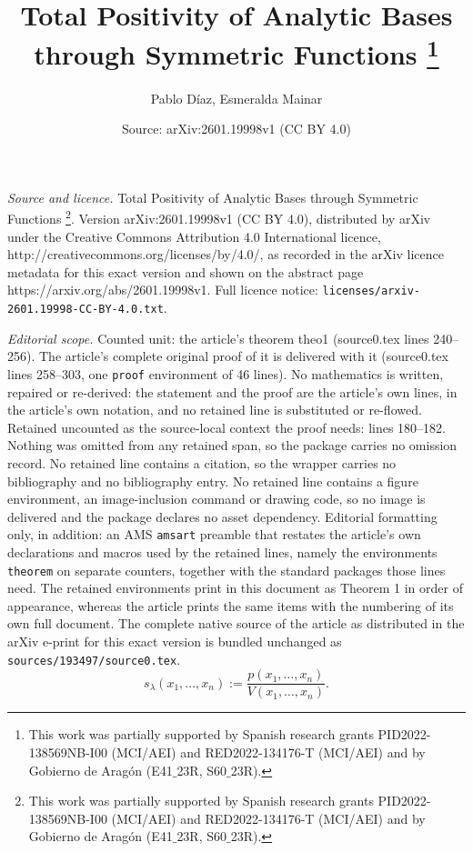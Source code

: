 \documentclass[10pt,a4paper]{amsart}
\title{Total Positivity of Analytic Bases through Symmetric Functions \protect\thanks{This work was partially supported by Spanish research grants PID2022-138569NB-I00 (MCI/AEI) and RED2022-134176-T (MCI/AEI) and by Gobierno de Aragón (E41$\_$23R, S60$\_$23R).}}
\author{Pablo D\'iaz, Esmeralda Mainar}
\date{Source: arXiv:2601.19998v1 (CC BY 4.0)}
\begin{document}
\maketitle

\noindent\emph{Source and licence.} Total Positivity of Analytic Bases through Symmetric Functions \protect\thanks{This work was partially supported by Spanish research grants PID2022-138569NB-I00 (MCI/AEI) and RED2022-134176-T (MCI/AEI) and by Gobierno de Aragón (E41$\_$23R, S60$\_$23R).}. Version arXiv:2601.19998v1 (CC BY 4.0), distributed by arXiv under the Creative Commons Attribution 4.0 International licence, http://creativecommons.org/licenses/by/4.0/, as recorded in the arXiv licence metadata for this exact version and shown on the abstract page https://arxiv.org/abs/2601.19998v1. Full licence notice: \texttt{licenses/arxiv-2601.19998-CC-BY-4.0.txt}.\par\smallskip

\noindent\textit{Editorial scope.} Counted unit: the article's theorem theo1 (source0.tex lines 240--256). The article's complete original proof of it is delivered with it (source0.tex lines 258--303, one \texttt{proof} environment of 46 lines). No mathematics is written, repaired or re-derived: the statement and the proof are the article's own lines, in the article's own notation, and no retained line is substituted or re-flowed.  Retained uncounted as the source-local context the proof needs: lines 180--182.  Nothing was omitted from any retained span, so the package carries no omission record.  No retained line contains a citation, so the wrapper carries no bibliography and no bibliography entry.  No retained line contains a figure environment, an image-inclusion command or drawing code, so no image is delivered and the package declares no asset dependency.  Editorial formatting only, in addition: an AMS \texttt{amsart} preamble that restates the article's own declarations and macros used by the retained lines, namely the environments \texttt{theorem} on separate counters, together with the standard packages those lines need.  The retained environments print in this document as Theorem 1 in order of appearance, whereas the article prints the same items with the numbering of its own full document.  The complete native source of the article as distributed in the arXiv e-print for this exact version is bundled unchanged as \texttt{sources/193497/source0.tex}.
\begin{equation}\label{schurdef}
s_\lambda(x_1, \dots, x_n) := \frac{ p(x_1, \dots, x_n) }{ V(x_1, \ldots, x_n)}.
\end{equation}  
\end{document}
